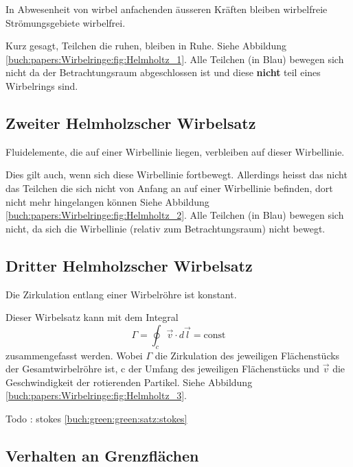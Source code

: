 \begin{displayquote}
    In Abwesenheit von wirbel anfachenden äusseren Kräften bleiben wirbelfreie Strömungsgebiete wirbelfrei.
\end{displayquote}

Kurz gesagt, Teilchen die ruhen, bleiben in Ruhe. 
Siehe Abbildung \ref{buch:papers:Wirbelringe:fig:Helmholtz_1}. 
Alle Teilchen (in Blau) bewegen sich nicht da der Betrachtungsraum abgeschlossen ist und diese \textbf{nicht} teil eines Wirbelrings sind.

\subsection{Zweiter Helmholzscher Wirbelsatz}

\begin{displayquote}
    Fluidelemente, die auf einer Wirbellinie liegen, verbleiben auf dieser Wirbellinie.
\end{displayquote}

Dies gilt auch, wenn sich diese Wirbellinie fortbewegt. 
Allerdings heisst das nicht das Teilchen die sich nicht von Anfang an auf einer Wirbellinie befinden, dort nicht mehr hingelangen können  
Siehe Abbildung \ref{buch:papers:Wirbelringe:fig:Helmholtz_2}. 
Alle Teilchen (in Blau) bewegen sich nicht, da sich die Wirbellinie (relativ zum Betrachtungsraum) nicht bewegt.

\subsection{Dritter Helmholzscher Wirbelsatz}

\begin{displayquote}
    Die Zirkulation entlang einer Wirbelröhre ist konstant. 
\end{displayquote}

Dieser Wirbelsatz kann mit dem Integral 
\[
\Gamma
= 
\oint_{c} \vec{v} \cdot d \vec{l}
=
\text{const}
\]
zusammengefasst werden. 
Wobei \(\Gamma\) die Zirkulation des jeweiligen Flächenstücks der Gesamtwirbelröhre ist, c der Umfang des jeweiligen Flächenstücks und \(\vec{v}\) die Geschwindigkeit der rotierenden Partikel. 
Siehe Abbildung \ref{buch:papers:Wirbelringe:fig:Helmholtz_3}. 


Todo : stokes \ref{buch:green:green:satz:stokes}

\subsection{Verhalten an Grenzflächen \label{paper:Wirbelringe:Grenzflaechen}}

